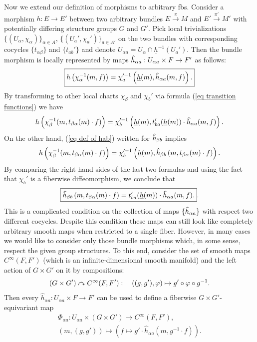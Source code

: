 Now we extend our definition of morphisms to arbitrary \glspl{fb}. Consider a morphism $h:E\to E'$ between two arbitrary bundles $E\overset{\pi}{\to}M$ and $E'\overset{\pi'}{\to}M'$ with potentially differing structure groups $G$ and $G'$. Pick local trivializations $\{(U_\alpha,\chi_\alpha)\}_{\alpha\in A}$, $\{(U_a',\chi_a')\}_{a\in A'}$ on the two bundles with corresponding cocycles $\{t_{\alpha\beta}\}$ and $\{t_{ab}'\}$ and denote $U_{\alpha a}=U_\alpha\cap \underline{h}^{-1}(U_a')$. Then the bundle morphism is locally represented by maps
$\wh{h}_{\alpha a}:U_{\alpha a}\times F\to F'$ as follows: 
\[\boxed{h\left(\chi_\alpha^{-1}(m,f)\right)=\chi_a^{\prime-1}\left(\underline{h}(m),\wh{h}_{\alpha a}(m,f)\right).}\label{eq def of hab}\]
By transforming to other local charts $\chi_\beta$ and $\chi_b'$ via formula (\ref{eq transition functions}) we have
\[h\left(\chi_\beta^{-1}(m,t_{\beta\alpha}(m)\cdot f)\right)=\chi_b^{\prime-1}\left(\underline{h}(m),t_{ba}'(\underline{h}(m))\cdot\wh{h}_{\alpha a}(m,f)\right).\]
On the other hand, (\ref{eq def of hab}) written for $\wh{h}_{\beta b}$ implies
\[h\left(\chi_\beta^{-1}(m,t_{\beta\alpha}(m)\cdot f)\right)=\chi_b^{\prime-1}\left(\underline{h}(m),\wh{h}_{\beta b}\left(m,t_{\beta\alpha}(m)\cdot f\right)\right).\]
By comparing the right hand sides of the last two formulas and using the fact that $\chi_b'$ is a fiberwise diffeomorphism, we conclude that
\[\boxed{\wh{h}_{\beta b}\left(m,t_{\beta\alpha}(m)\cdot f\right)=t_{ba}'(\underline{h}(m))\cdot \wh{h}_{\alpha a}(m,f).}\label{eq transformation of hab}.\]
This is a complicated condition on the collection of maps $\{\wh{h}_{\alpha a}\}$ with respect two different cocycles. Despite this condition these maps can still look like completely arbitrary smooth maps when restricted to a single fiber. However, in many cases we would like to consider only those bundle morphisms which, in some sense, respect the given group structures. To this end, consider the set of smooth maps $C^\infty(F,F')$ (which is an infinite-dimensional smooth manifold) and the left action of $G\times G'$ on it by compositions:
\[(G\times G')\curvearrowright C^\infty(F,F'):\quad ((g,g'),\varphi)\mapsto g'\circ \varphi\circ g^{-1}.\]
Then every $\hat{h}_{\alpha a}:U_{\alpha a}\times F\to F'$ can be used to define a fiberwise $G\times G'$-equivariant map
\begin{gather}
    \Phi_{\alpha a}: U_{\alpha a}\times (G\times G')\to C^\infty(F,F'),\\
    (m,(g,g'))\mapsto \left(f\mapsto g'\cdot \hat{h}_{\alpha a}\left(m,g^{-1}\cdot f\right)\right).\label{def Phiab}
\end{gather}
